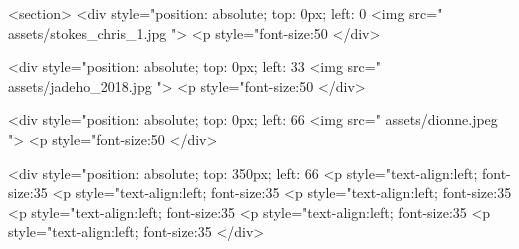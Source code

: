 				<section>
					<div style="position: absolute; top: 0px; left: 0%
                                            <img src=" assets/stokes_chris_1.jpg ">
        				    <p style="font-size:50%
                                        </div>
                                            
					<div style="position: absolute; top: 0px; left: 33%
                                            <img src=" assets/jadeho_2018.jpg ">
        				    <p style="font-size:50%
                                        </div>
                                            
					<div style="position: absolute; top: 0px; left: 66%
                                            <img src=" assets/dionne.jpeg ">
        				    <p style="font-size:50%
                                        </div>
                                            
					<div style="position: absolute; top: 350px; left: 66%
        				    <p style="text-align:left; font-size:35%
        				    <p style="text-align:left; font-size:35%
        				    <p style="text-align:left; font-size:35%
        				    <p style="text-align:left; font-size:35%
        				    <p style="text-align:left; font-size:35%
        				    <p style="text-align:left; font-size:35%
                                        </div>

